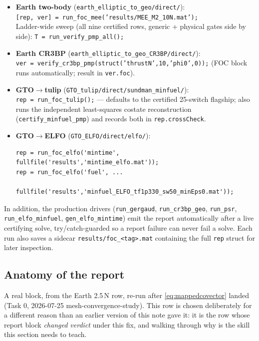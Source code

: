 \documentclass[11pt]{article}
\newcommand{\file}[1]{\texttt{#1}}
\newcommand{\code}[1]{\texttt{#1}}
\begin{document}
\begin{itemize}[leftmargin=2em]
\item \textbf{Earth two-body} (\file{earth\_elliptic\_to\_geo/direct/}):\\
\code{[rep, ver] = run\_foc\_mee('results/MEE\_M2\_10N.mat');}\\
Ladder-wide sweep (all nine certified rows, generic + physical gates side by
side): \code{T = run\_verify\_pmp\_all();}
\item \textbf{Earth CR3BP} (\file{earth\_elliptic\_to\_geo\_CR3BP/direct/}):\\
\code{ver = verify\_cr3bp\_pmp(struct('thrustN',10,'phi0',0));}
(FOC block runs automatically; result in \code{ver.foc}).
\item \textbf{GTO$\to$tulip} (\file{GTO\_tulip/direct/sundman\_minfuel/}):\\
\code{rep = run\_foc\_tulip();} --- defaults to the certified 25-switch
flagship; also runs the independent least-squares costate reconstruction
(\code{certify\_minfuel\_pmp}) and records both in \code{rep.crossCheck}.
\item \textbf{GTO$\to$ELFO} (\file{GTO\_ELFO/direct/elfo/}):
\begin{small}
\begin{verbatim}
rep = run_foc_elfo('mintime', fullfile('results','mintime_elfo.mat'));
rep = run_foc_elfo('fuel', ...
       fullfile('results','minfuel_ELFO_tf1p330_sw50_minEps0.mat'));
\end{verbatim}
\end{small}
\end{itemize}

\noindent
In addition, the production drivers (\code{run\_gergaud},
\code{run\_cr3bp\_geo}, \code{run\_psr}, \code{run\_elfo\_minfuel},
\code{gen\_elfo\_mintime}) emit the report automatically after a live
certifying solve, try/catch-guarded so a report failure can never fail a
solve. Each run also saves a sidecar
\code{results/foc\_<tag>.mat} containing the full \code{rep} struct for later
inspection.

\subsection{Anatomy of the report}

A real block, from the Earth 2.5\,N row, re-run after \eqref{eq:mappedcovector}
landed (Task 0, 2026-07-25 mesh-convergence-study). This row is chosen
deliberately for a different reason than an earlier version of this note gave
it: it is the row whose report block \emph{changed verdict} under this fix,
and walking through why is the skill this section needs to teach.
\end{document}

